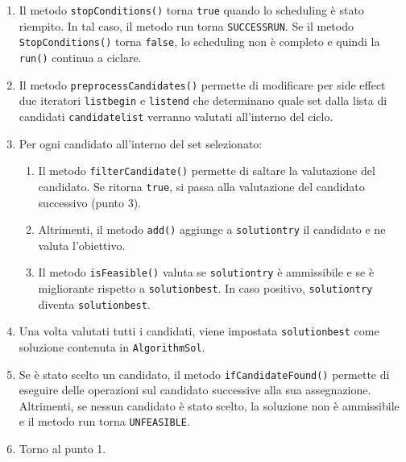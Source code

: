 \begin{enumerate}
    \item Il metodo \texttt{stopConditions()} torna \texttt{true} quando lo scheduling è stato riempito. In tal caso, il metodo run torna \texttt{SUCCESS\textunderscore RUN}. Se il metodo \texttt{StopConditions()} torna \texttt{false}, lo scheduling non è completo e quindi la \texttt{run()} continua a ciclare.
    \item Il metodo \texttt{preprocessCandidates()} permette di modificare per side effect due iteratori \texttt{list\textunderscore begin} e \texttt{list\textunderscore end} che determinano quale set dalla lista di candidati \texttt{candidate\textunderscore list} verranno valutati all'interno del ciclo.
    \item Per ogni candidato all'interno del set selezionato:
    \begin{enumerate}
        \item Il metodo \texttt{filterCandidate()} permette di saltare la valutazione del candidato. Se ritorna \texttt{true}, si passa alla valutazione del candidato successivo (punto 3).
        \item Altrimenti, il metodo \texttt{add()} aggiunge a \texttt{solution\textunderscore try} il candidato e ne valuta l'obiettivo.
        \item Il metodo \texttt{isFeasible()} valuta se \texttt{solution\textunderscore try} è ammissibile e se è migliorante rispetto a  \texttt{solution\textunderscore best}. In caso positivo, \texttt{solution\textunderscore try} diventa \texttt{solution\textunderscore best}.
    \end{enumerate}
\item Una volta valutati tutti i candidati, viene impostata \texttt{solution\textunderscore best} come soluzione contenuta in \texttt{AlgorithmSol}.
\item Se è stato scelto un candidato, il metodo \texttt{ifCandidateFound()} permette di eseguire delle operazioni sul candidato successive alla sua assegnazione. Altrimenti, se nessun candidato è stato scelto, la soluzione non è ammissibile e il metodo run torna \texttt{UNFEASIBLE}. 
\item Torno al punto 1.
\end{enumerate}
\newpage
